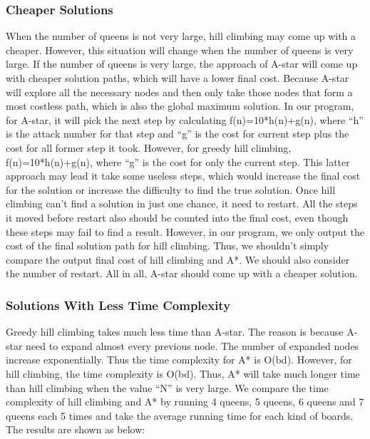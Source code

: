 \documentclass[11pt, a4paper]{article}
\begin{document}
\subsubsection{Cheaper Solutions}

When the number of queens is not very large, hill climbing may come up with a cheaper. However, this situation will change when the number of queens is very large. If the number of queens is very large, the approach of A-star will come up with cheaper solution paths, which will have a lower final cost. Because A-star will explore all the necessary nodes and then only take those nodes that form a most costless path, which is also the global maximum solution. In our program, for A-star, it will pick the next step by calculating f(n)=10*h(n)+g(n), where “h” is the attack number for that step and “g” is the cost for current step plus the cost for all former step it took. However, for greedy hill climbing, f(n)=10*h(n)+g(n), where “g” is the cost for only the current step. This latter approach may lead it take some useless steps, which would increase the final cost for the solution or increase the difficulty to find the true solution. Once hill climbing can’t find a solution in just one chance, it need to restart. All the steps it moved before restart also should be counted into the final cost, even though these steps may fail to find a result. However, in our program, we only output the cost of the final solution path for hill climbing. Thus, we shouldn’t simply compare the output final cost of hill climbing and A*. We should also consider the number of restart. All in all, A-star should come up with a cheaper solution.


\subsubsection{Solutions With Less Time Complexity}


Greedy hill climbing takes much less time than A-star. The reason is because A-star need to expand almost every previous node. The number of expanded nodes increase exponentially. Thus the time complexity for A* is O(bd). However, for hill climbing, the time complexity is O(bd). Thus, A* will take much longer time than hill climbing when the value “N” is very large. We compare the time complexity of hill climbing and A* by running 4 queens, 5 queens, 6 queens and 7 queens each 5 times and take the average running time for each kind of boards. The results are shown as below:
\end{document}
